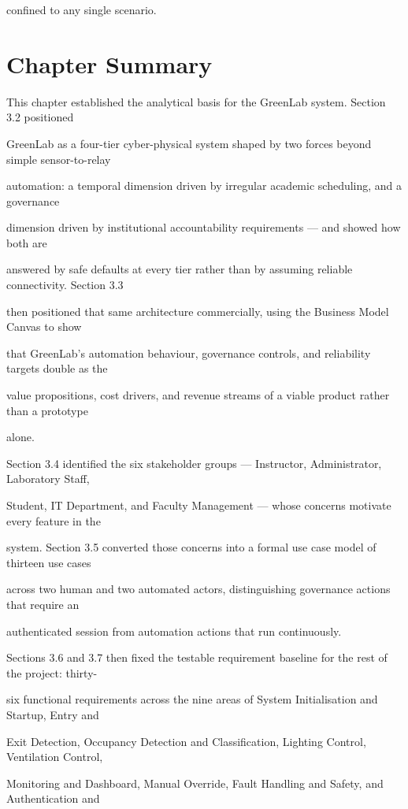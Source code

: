 confined to any single scenario.


\section{Chapter Summary}
This chapter established the analytical basis for the GreenLab system. Section 3.2 positioned

GreenLab as a four-tier cyber-physical system shaped by two forces beyond simple sensor-to-relay

automation: a temporal dimension driven by irregular academic scheduling, and a governance

dimension driven by institutional accountability requirements --- and showed how both are

answered by safe defaults at every tier rather than by assuming reliable connectivity. Section 3.3

then positioned that same architecture commercially, using the Business Model Canvas to show

that GreenLab's automation behaviour, governance controls, and reliability targets double as the

value propositions, cost drivers, and revenue streams of a viable product rather than a prototype

alone.

Section 3.4 identified the six stakeholder groups --- Instructor, Administrator, Laboratory Staff,

Student, IT Department, and Faculty Management --- whose concerns motivate every feature in the

system. Section 3.5 converted those concerns into a formal use case model of thirteen use cases

across two human and two automated actors, distinguishing governance actions that require an

authenticated session from automation actions that run continuously.

Sections 3.6 and 3.7 then fixed the testable requirement baseline for the rest of the project: thirty-

six functional requirements across the nine areas of System Initialisation and Startup, Entry and

Exit Detection, Occupancy Detection and Classification, Lighting Control, Ventilation Control,

Monitoring and Dashboard, Manual Override, Fault Handling and Safety, and Authentication and

